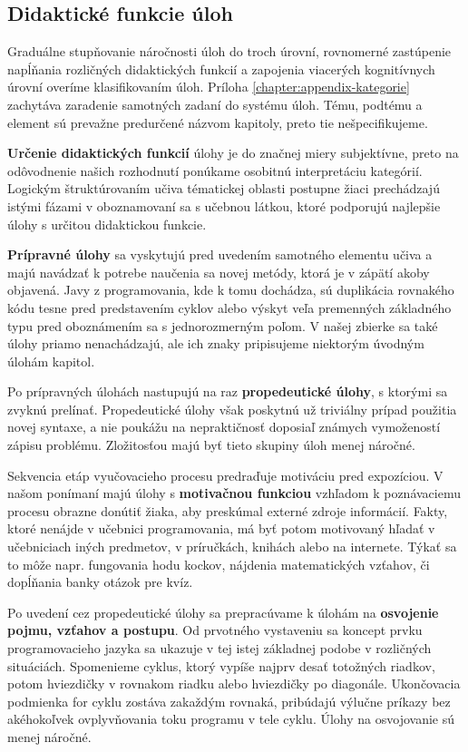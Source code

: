 \subsection{Didaktické funkcie úloh}
Graduálne stupňovanie náročnosti úloh do troch úrovní, rovnomerné zastúpenie napĺňania rozličných didaktických funkcií a zapojenia viacerých kognitívnych úrovní overíme klasifikovaním úloh. Príloha \ref{chapter:appendix-kategorie} zachytáva zaradenie samotných zadaní do systému úloh. Tému, podtému a element sú prevažne predurčené názvom kapitoly, preto tie nešpecifikujeme.

\textbf{Určenie didaktických funkcií} úlohy je do značnej miery subjektívne, preto na odôvodnenie našich rozhodnutí ponúkame osobitnú interpretáciu kategórií. Logickým štruktúrovaním učiva tématickej oblasti postupne žiaci prechádzajú istými fázami v oboznamovaní sa s učebnou látkou, ktoré podporujú najlepšie úlohy s určitou didaktickou funkcie.

\textbf{Prípravné úlohy} sa vyskytujú pred uvedením samotného elementu učiva a majú navádzať k potrebe naučenia sa novej metódy, ktorá je v zápätí akoby objavená. Javy z programovania, kde k tomu dochádza, sú duplikácia rovnakého kódu tesne pred predstavením cyklov alebo výskyt veľa premenných základného typu pred oboznámením sa s jednorozmerným poľom. V našej zbierke sa také úlohy priamo nenachádzajú, ale ich znaky pripisujeme niektorým úvodným úlohám kapitol.

Po prípravných úlohách nastupujú na raz \textbf{propedeutické úlohy}, s ktorými sa zvyknú prelínať. Propedeutické úlohy však poskytnú už triviálny prípad použitia novej syntaxe, a nie poukážu na nepraktičnosť doposiaľ známych vymožeností zápisu problému. Zložitosťou majú byť tieto skupiny úloh menej náročné.

Sekvencia etáp vyučovacieho procesu predraďuje motiváciu pred expozíciou. V našom ponímaní majú úlohy s \textbf{motivačnou funkciou} vzhľadom k poznávaciemu procesu obrazne donútiť žiaka, aby preskúmal externé zdroje informácií. Fakty, ktoré nenájde v učebnici programovania, má byť potom motivovaný hľadať v učebniciach iných predmetov, v príručkách, knihách alebo na internete. Týkať sa to môže napr. fungovania hodu kockov, nájdenia matematických vzťahov, či dopĺňania banky otázok pre kvíz.

Po uvedení cez propedeutické úlohy sa prepracúvame k úlohám na \textbf{osvojenie pojmu, vzťahov a postupu}. Od prvotného vystaveniu sa koncept prvku programovacieho jazyka sa
ukazuje v tej istej základnej podobe v rozličných situáciách. Spomenieme cyklus, ktorý vypíše najprv desať totožných riadkov, potom hviezdičky v rovnakom riadku alebo hviezdičky po diagonále. Ukončovacia podmienka for cyklu zostáva zakaždým rovnaká, pribúdajú výlučne príkazy bez akéhokoľvek ovplyvňovania toku programu v tele cyklu. Úlohy na osvojovanie sú menej náročné.

